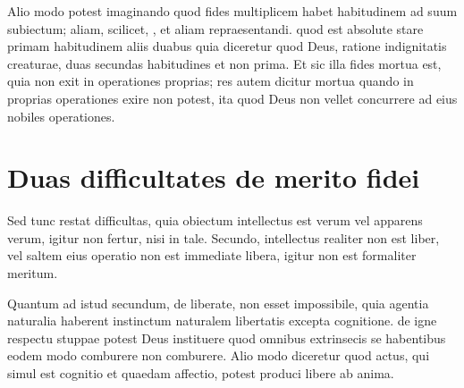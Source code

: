 \documentclass[twoside, openright]{report}
\begin{document}
\pstart
{}
Alio modo potest  imaginando quod fides multiplicem habet habitudinem ad suum subiectum;  aliam, scilicet, , et aliam repraesentandi.   quod  est absolute stare primam habitudinem aliis duabus  quia diceretur quod Deus, ratione indignitatis creaturae,  duas secundas habitudines et non prima. Et sic illa fides mortua est, quia non exit in operationes  proprias; 
res autem dicitur mortua quando in proprias operationes exire non potest, ita quod Deus non vellet concurrere ad eius nobiles operationes.
\pend

\bigskip
\section*{\textlangle{}Duas difficultates de merito fidei\textrangle{}} 
\pstart
{}
Sed tunc restat difficultas, quia obiectum intellectus est verum vel apparens verum, igitur non fertur, nisi in tale. Secundo, intellectus realiter non est liber, vel saltem eius operatio non est immediate libera, igitur non est formaliter meritum.
\pend

\pstart
{}
Quantum ad istud secundum, de liberate, non esset impossibile, quia agentia naturalia haberent instinctum naturalem libertatis excepta cognitione.  de igne respectu stuppae potest Deus instituere quod omnibus extrinsecis  se habentibus eodem modo  comburere  non comburere. Alio modo diceretur quod actus, qui simul est cognitio et quaedam affectio,  
potest produci libere ab anima.
\pend
\end{document}
